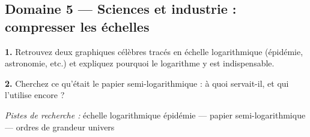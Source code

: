 \documentclass[11pt,a4paper]{article}
\newcommand{\champ}[1]{\makebox[#1]{\dotfill}}
\begin{document}
\subsection*{Domaine 5 --- Sciences et industrie : compresser les échelles}
\textbf{1.} Retrouvez deux graphiques célèbres tracés en échelle logarithmique (épidémie, astronomie, etc.) et expliquez pourquoi le logarithme y est indispensable.
\par\smallskip
\textbf{2.} Cherchez ce qu'était le papier semi-logarithmique : à quoi servait-il, et qui l'utilise encore ?
\par\smallskip
{\small\emph{Pistes de recherche :} échelle logarithmique épidémie --- papier semi-logarithmique --- ordres de grandeur univers}
\par\smallskip
\noindent\makebox[\linewidth]{\dotfill}\par\vspace{1em}
\noindent\makebox[\linewidth]{\dotfill}\par\vspace{1em}
\par\smallskip{\small Sources : \champ{0.96\linewidth}}\par\medskip
\end{document}
